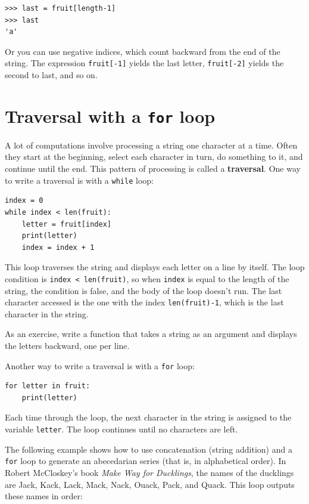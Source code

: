 \documentclass[10pt]{book}
\begin{document}
\begin{verbatim}
>>> last = fruit[length-1]
>>> last
'a'
\end{verbatim}
%
Or you can use negative indices, which count backward from
the end of the string.  The expression {\tt fruit[-1]} yields the last
letter, {\tt fruit[-2]} yields the second to last, and so on.


\section{Traversal with a {\tt for} loop}
\label{for}

A lot of computations involve processing a string one character at a
time.  Often they start at the beginning, select each character in
turn, do something to it, and continue until the end.  This pattern of
processing is called a {\bf traversal}.  One way to write a traversal
is with a {\tt while} loop:

\begin{verbatim}
index = 0
while index < len(fruit):
    letter = fruit[index]
    print(letter)
    index = index + 1
\end{verbatim}
%
This loop traverses the string and displays each letter on a line by
itself.  The loop condition is {\tt index < len(fruit)}, so
when {\tt index} is equal to the length of the string, the
condition is false, and the body of the loop doesn't run.  The
last character accessed is the one with the index {\tt len(fruit)-1},
which is the last character in the string.

As an exercise, write a function that takes a string as an argument
and displays the letters backward, one per line.

Another way to write a traversal is with a {\tt for} loop:

\begin{verbatim}
for letter in fruit:
    print(letter)
\end{verbatim}
%
Each time through the loop, the next character in the string is assigned
to the variable {\tt letter}.  The loop continues until no characters are
left.

The following example shows how to use concatenation (string addition)
and a {\tt for} loop to generate an abecedarian series (that is, in
alphabetical order).  In Robert McCloskey's book {\em Make
Way for Ducklings}, the names of the ducklings are Jack, Kack, Lack,
Mack, Nack, Ouack, Pack, and Quack.  This loop outputs these names in
order:
\end{document}
